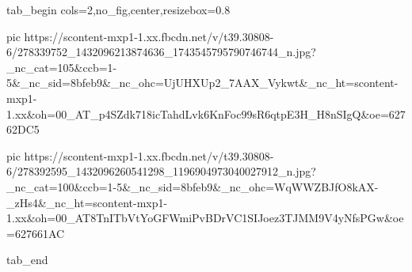  
 
 
 
 

\ifcmt
  tab_begin cols=2,no_fig,center,resizebox=0.8

     pic https://scontent-mxp1-1.xx.fbcdn.net/v/t39.30808-6/278339752_1432096213874636_1743545795790746744_n.jpg?_nc_cat=105&ccb=1-5&_nc_sid=8bfeb9&_nc_ohc=UjUHXUp2_7AAX_Vykwt&_nc_ht=scontent-mxp1-1.xx&oh=00_AT_p4SZdk718icTahdLvk6KnFoc99sR6qtpE3H_H8nSIgQ&oe=62762DC5

     pic https://scontent-mxp1-1.xx.fbcdn.net/v/t39.30808-6/278392595_1432096260541298_1196904973040027912_n.jpg?_nc_cat=100&ccb=1-5&_nc_sid=8bfeb9&_nc_ohc=WqWWZBJfO8kAX-_zHs4&_nc_ht=scontent-mxp1-1.xx&oh=00_AT8TnITbVtYoGFWmiPvBDrVC1SIJoez3TJMM9V4yNfsPGw&oe=627661AC

  tab_end
\fi
